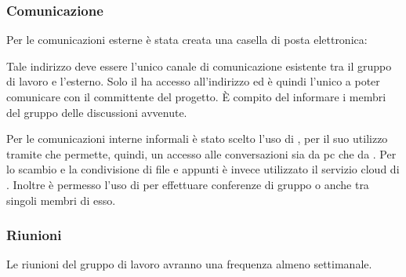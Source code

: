 \documentclass[12pt,a4paper]{article}
\begin{document}
\newpage
\subsubsection{Comunicazione}
Per le comunicazioni esterne è stata creata una casella di posta elettronica:\\
\begin{center}
\href{mailto:\mailGruppo{}}{\mailGruppo{}}
\end{center}
Tale indirizzo deve essere l’unico canale di comunicazione esistente tra il gruppo di lavoro e l’esterno. Solo il \PM{} ha accesso all’indirizzo ed è quindi l’unico a poter comunicare con il committente del progetto. È compito del \PM{} informare i membri del gruppo delle discussioni avvenute.

Per le comunicazioni interne informali è stato scelto l’uso di , per il suo utilizzo tramite  che permette, quindi, un accesso alle conversazioni sia da pc che da .
Per lo scambio e la condivisione di file e appunti è invece utilizzato il servizio cloud di . Inoltre è permesso l’uso di  per effettuare conferenze di gruppo o anche tra singoli membri di esso.

\subsubsection{Riunioni}
Le riunioni del gruppo di lavoro avranno una frequenza almeno settimanale.
\end{document}
